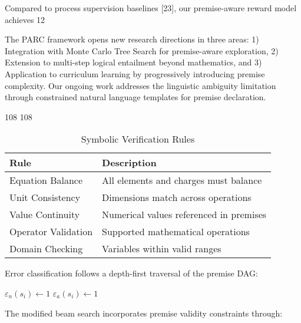 \documentclass{article}
\begin{document}
Compared to process supervision baselines [23], our premise-aware reward model achieves 12%

The PARC framework opens new research directions in three areas: 1) Integration with Monte Carlo Tree Search for premise-aware exploration, 2) Extension to multi-step logical entailment beyond mathematics, and 3) Application to curriculum learning by progressively introducing premise complexity. Our ongoing work addresses the linguistic ambiguity limitation through constrained natural language templates for premise declaration.

 108 108
\begin{table}[h]
\centering
\caption{Symbolic Verification Rules}
\label{tab:sym-checks}
\begin{tabular}{ll}
\textbf{Rule} & \textbf{Description} \\
\hline
Equation Balance & All elements and charges must balance \\
Unit Consistency & Dimensions match across operations \\
Value Continuity & Numerical values referenced in premises \\
Operator Validation & Supported mathematical operations \\
Domain Checking & Variables within valid ranges \\
\end{tabular}
\end{table}
Error classification follows a depth-first traversal of the premise DAG:

\begin{algorithm}[H]
\begin{algorithmic}[1]
\State $\varepsilon_n(s_i) \leftarrow 1$ 
\State $\varepsilon_a(s_i) \leftarrow 1$ 
\EndIf
\EndFor
\end{algorithmic}
\end{algorithm}

The modified beam search incorporates premise validity constraints through:
\end{document}
